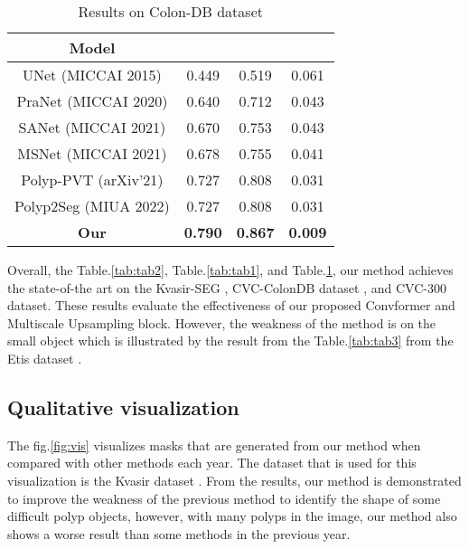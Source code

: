 \documentclass[conference]{IEEEtran}
\begin{document}
\begin{table}[H]
\begin{center}
\begin{tabular}{|c| c | c| c|} 
 \hline
 Model &  &  &  \\ [0.5ex] 
 \hline
 UNet (MICCAI 2015) \cite{unet} & 0.449 & 0.519 & 0.061 \\


 PraNet (MICCAI 2020) \cite{pranet}  & 0.640 & 0.712 & 0.043 \\


SANet (MICCAI 2021) \cite{sanet} & 0.670 & 0.753 & 0.043 \\

MSNet (MICCAI 2021) \cite{MSNet} & 0.678 & 0.755 & 0.041 \\

Polyp-PVT (arXiv'21) \cite{pvt} &  0.727 & 0.808 & 0.031\\


Polyp2Seg (MIUA 2022) \cite{polyp2seg} & 0.727 & 0.808 & 0.031\\
\hline

\textbf{Our} & \textbf{0.790} & \textbf{0.867} & \textbf{0.009} \\

 \hline
\end{tabular}
\end{center}
\caption{Results on Colon-DB dataset \cite{colondb}}
\label{tab:tab4}
\end{table}
Overall, the Table.\ref{tab:tab2}, Table.\ref{tab:tab1}, and Table.\ref{tab:tab4}, our method achieves the state-of-the art on the Kvasir-SEG \cite{jha2020medico}, CVC-ColonDB dataset \cite{colondb}, and CVC-300 \cite{cvc300} dataset. These results evaluate the effectiveness of our proposed Convformer and Multiscale Upsampling block. However, the weakness of the method is on the small object which is illustrated by the result from the Table.\ref{tab:tab3} from the Etis dataset \cite{etis}.
\subsection{Qualitative visualization}

The fig.\ref{fig:vis} visualizes masks that are generated from our method when compared with other methods each year. The dataset that is used for this visualization is the Kvasir dataset \cite{kvasir-seg}. From the results, our method is demonstrated to improve the weakness of the previous method to identify the shape of some difficult polyp objects, however, with many polyps in the image, our method also shows a worse result than some methods in the previous year.
\end{document}
